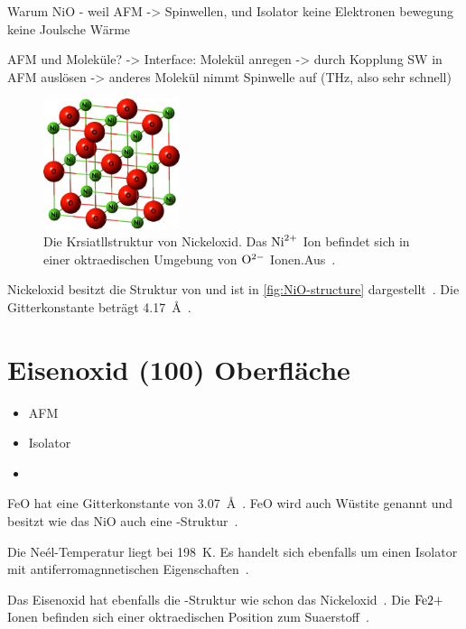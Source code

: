         Warum NiO - weil AFM -> Spinwellen, und Isolator keine Elektronen bewegung keine Joulsche Wärme

        AFM und Moleküle? -> Interface: Molekül anregen -> durch Kopplung SW in AFM auslösen -> anderes Molekül nimmt Spinwelle auf (THz, also sehr schnell)
        \begin{figure}
            \centering
            \includegraphics[width=4cm]{./content/NiO-structure}
            \caption{Die Krsiatllstruktur von Nickeloxid. Das $\ce{Ni}^{2+}$ Ion befindet sich in einer oktraedischen Umgebung von $\ce{O}^{2-}$ Ionen.Aus~\cite{NiO-structure}.}
            \label{fig:NiO-structure}
        \end{figure}

        Nickeloxid besitzt die Struktur von  und ist in \autoref{fig:NiO-structure} dargestellt~\cite{kunz_chemisorption_1985}. 
        Die Gitterkonstante beträgt \SI{4.17}{\angstrom}~\cite{sebbari_uranyl_2012}.

    \section{Eisenoxid (100) Oberfläche}
        \begin{itemize}
            \item AFM
            \item Isolator
            \item 
        \end{itemize}
        FeO hat eine Gitterkonstante von \SI{3.07}{\angstrom}~\cite{FeO_1}.
        FeO wird auch Wüstite genannt und besitzt wie das NiO auch eine -Struktur~\cite{FeO_4}.
        
        Die Neél-Temperatur liegt bei \SI{198}{\kelvin}.
        Es handelt sich ebenfalls um einen Isolator mit antiferromagnnetischen Eigenschaften~\cite{FeO_4}.

        Das Eisenoxid hat ebenfalls die -Struktur wie schon das Nickeloxid~\cite{FeO_4}.
        Die $\ce{Fe{2+}}$ Ionen befinden sich einer oktraedischen Position zum Suaerstoff~\cite{FeO_4}.


